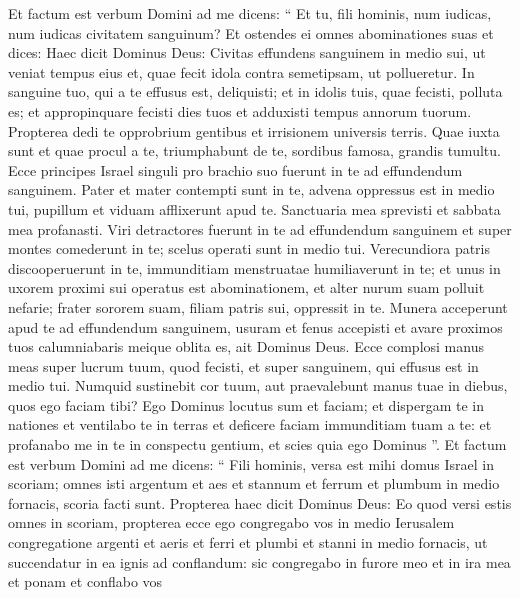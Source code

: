 \begin{biblechapter}
\begin{biblechapter}
\begin{biblechapter}
\begin{biblechapter}
\begin{biblechapter}
\begin{biblechapter}
\begin{biblechapter}
\begin{biblechapter}
\begin{biblechapter}
\begin{biblechapter}
\begin{biblechapter}
\begin{biblechapter}
\begin{biblechapter}
\begin{biblechapter}
\begin{biblechapter}
\begin{biblechapter}
\begin{biblechapter}
\begin{biblechapter}
\begin{biblechapter}
\begin{biblechapter}
\begin{biblechapter}
\begin{biblechapter}
\verse Et factum est verbum Domini ad me dicens: 
\verse “ Et tu, fili hominis, num iudicas, num iudicas civitatem sanguinum? 
\verse Et ostendes ei omnes abominationes suas et dices: Haec dicit Dominus Deus: Civitas effundens sanguinem in medio sui, ut veniat tempus eius et, quae fecit idola contra semetipsam, ut pollueretur. 
\verse In sanguine tuo, qui a te effusus est, deliquisti; et in idolis tuis, quae fecisti, polluta es; et appropinquare fecisti dies tuos et adduxisti tempus annorum tuorum. Propterea dedi te opprobrium gentibus et irrisionem universis terris. 
\verse Quae iuxta sunt et quae procul a te, triumphabunt de te, sordibus famosa, grandis tumultu. 
\verse Ecce principes Israel singuli pro brachio suo fuerunt in te ad effundendum sanguinem. 
\verse Pater et mater contempti sunt in te, advena oppressus est in medio tui, pupillum et viduam afflixerunt apud te. 
\verse Sanctuaria mea sprevisti et sabbata mea profanasti. 
\verse Viri detractores fuerunt in te ad effundendum sanguinem et super montes comederunt in te; scelus operati sunt in medio tui. 
\verse Verecundiora patris discooperuerunt in te, immunditiam menstruatae humiliaverunt in te; 
\verse et unus in uxorem proximi sui operatus est abominationem, et alter nurum suam polluit nefarie; frater sororem suam, filiam patris sui, oppressit in te. 
\verse Munera acceperunt apud te ad effundendum sanguinem, usuram et fenus accepisti et avare proximos tuos calumniabaris meique oblita es, ait Dominus Deus.
 \verse Ecce complosi manus meas super lucrum tuum, quod fecisti, et super sanguinem, qui effusus est in medio tui. 
\verse Numquid sustinebit cor tuum, aut praevalebunt manus tuae in diebus, quos ego faciam tibi? Ego Dominus locutus sum et faciam; 
\verse et dispergam te in nationes et ventilabo te in terras et deficere faciam immunditiam tuam a te: 
\verse et profanabo me in te in conspectu gentium, et scies quia ego Dominus ”.
 \verse Et factum est verbum Domini ad me dicens: 
\verse “ Fili hominis, versa est mihi domus Israel in scoriam; omnes isti argentum et aes et stannum et ferrum et plumbum in medio fornacis, scoria facti sunt. 
\verse Propterea haec dicit Dominus Deus: Eo quod versi estis omnes in scoriam, propterea ecce ego congregabo vos in medio Ierusalem 
\verse congregatione argenti et aeris et ferri et plumbi et stanni in medio fornacis, ut succendatur in ea ignis ad conflandum: sic congregabo in furore meo et in ira mea et ponam et conflabo vos 

\end{biblechapter}
\end{biblechapter}
\end{biblechapter}
\end{biblechapter}
\end{biblechapter}
\end{biblechapter}
\end{biblechapter}
\end{biblechapter}
\end{biblechapter}
\end{biblechapter}
\end{biblechapter}
\end{biblechapter}
\end{biblechapter}
\end{biblechapter}
\end{biblechapter}
\end{biblechapter}
\end{biblechapter}
\end{biblechapter}
\end{biblechapter}
\end{biblechapter}
\end{biblechapter}
\end{biblechapter}
